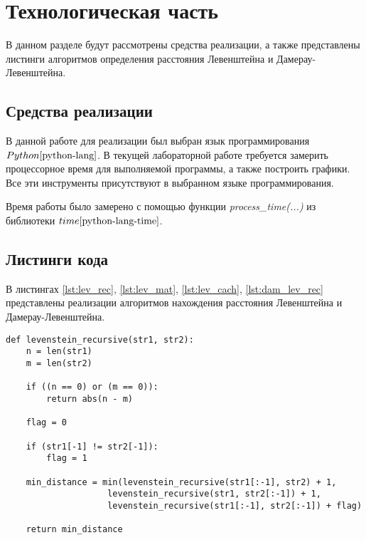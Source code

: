 \chapter{Технологическая часть}

В данном разделе будут рассмотрены средства реализации, а также представлены листинги алгоритмов определения расстояния Левенштейна и Дамерау-Левенштейна.

\section{Средства реализации}
В данной работе для реализации был выбран язык программирования $Python \cite{python-lang}$. В текущей лабораторной работе требуется замерить процессорное время для выполняемой программы, а также построить графики. Все эти инструменты присутствуют в выбранном языке программирования.

Время работы было замерено с помощью функции \textit{process\_time(...)} из библиотеки $time \cite{python-lang-time}$.


\section{Листинги кода}

В листингах \ref{lst:lev_rec}, \ref{lst:lev_mat}, \ref{lst:lev_cach},  \ref{lst:dam_lev_rec} представлены реализации алгоритмов нахождения расстояния Левенштейна и Дамерау-Левенштейна.

\clearpage

\begin{center}
    \captionsetup{justification=raggedright,singlelinecheck=off}
    \begin{lstlisting}[label=lst:lev_rec,caption=Алгоритм нахождения расстояния Левенштейна (реккурсивный)]
def levenstein_recursive(str1, str2):
    n = len(str1)
    m = len(str2)

    if ((n == 0) or (m == 0)):
        return abs(n - m)

    flag = 0

    if (str1[-1] != str2[-1]):
        flag = 1

    min_distance = min(levenstein_recursive(str1[:-1], str2) + 1,
                    levenstein_recursive(str1, str2[:-1]) + 1,
                    levenstein_recursive(str1[:-1], str2[:-1]) + flag)

    return min_distance
\end{lstlisting}
\end{center}


